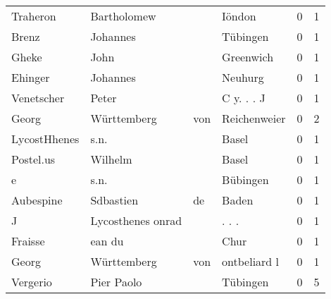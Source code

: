 \begin{center}
\begin{tiny}
\begin{longtabu}{llllrr}
                 Traheron &                        Bartholomew &             &                                      Iöndon &          0 &         1 \\
                    Brenz &                           Johannes &             &                                    Tübingen &          0 &         1 \\
                    Gheke &                               John &             &                                   Greenwich &          0 &         1 \\
                  Ehinger &                           Johannes &             &                                     Neuhurg &          0 &         1 \\
               Venetscher &                              Peter &             &                                  C y. . . J &          0 &         1 \\
                    Georg &                        Württemberg &         von &                                Reichenweier &          0 &         2 \\
             LycostHhenes &                               s.n. &             &                                       Basel &          0 &         1 \\
                Postel.us &                            Wilhelm &             &                                       Basel &          0 &         1 \\
                        e &                               s.n. &             &                                    Bübingen &          0 &         1 \\
                Aubespine &                          Sdbastien &          de &                                       Baden &          0 &         1 \\
                        J &                  Lycosthenes onrad &             &                                      . . .  &          0 &         1 \\
                  Fraisse &                             ean du &             &                                        Chur &          0 &         1 \\
                    Georg &                        Württemberg &         von &                                ontbeliard l &          0 &         1 \\
                 Vergerio &                         Pier Paolo &             &                                    Tübingen &          0 &         5 \\

\end{longtabu}
\end{tiny}
\end{center}
